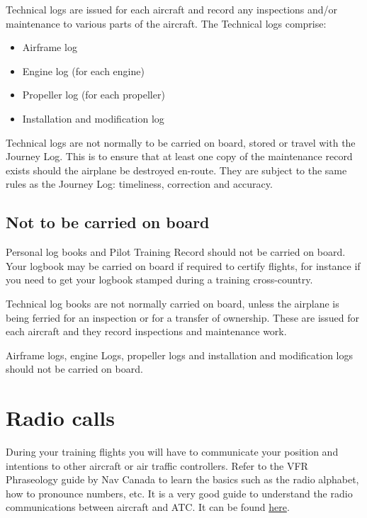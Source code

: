 \documentclass[12pt,letterpaper]{article}
\begin{document}
    Technical logs are issued for each aircraft and record any inspections and/or maintenance to various parts of the aircraft. The Technical logs comprise:
    \begin{itemize}
        \item Airframe log
        \item Engine log (for each engine)
        \item Propeller log (for each propeller)
        \item Installation and modification log
    \end{itemize}
    
    Technical logs are not normally to be carried on board, stored or travel with the Journey Log.  This is to ensure that at least one copy of the maintenance record exists should the airplane be destroyed en-route. They are subject to the same rules as the Journey Log: timeliness, correction and accuracy.

    \subsection{Not to be carried on board}
    
    Personal log books and Pilot Training Record should not be carried on board. Your logbook may be carried on board if required to certify flights, for instance if you need to get your logbook stamped during a training cross-country.
    
    Technical log books are not normally carried on board, unless the airplane is being ferried for an inspection or for a transfer of ownership. These are issued for each aircraft and they record inspections and maintenance work.  
    
    Airframe logs, engine Logs, propeller logs and installation and modification logs should not be carried on board.
    
    \section{Radio calls}
    During your training flights you will have to communicate your position and intentions to other aircraft or air traffic controllers. Refer to the VFR Phraseology guide by Nav Canada to learn the basics such as the radio alphabet, how to pronounce numbers, etc. It is a very good guide to understand the radio communications between aircraft and ATC. It can be found \href{https://www.navcanada.ca/en/vfr-phraseology.pdf}{\color{cyan}here}.
    
\end{document}
